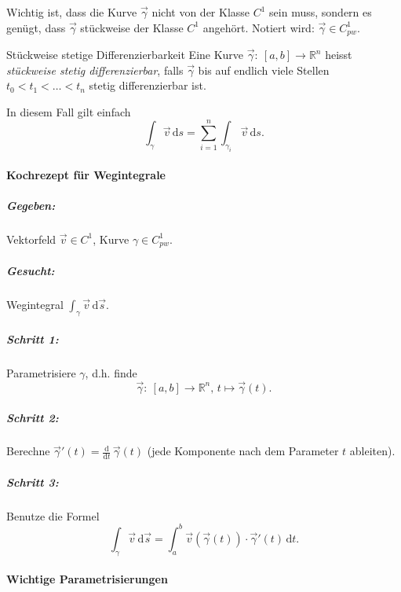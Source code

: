 \documentclass[a4paper,10pt]{article}
\def\R{\mathbb{R}}
\begin{document}
Wichtig ist, dass die Kurve \( \vec{\gamma} \) nicht von der Klasse \( C^1 \) sein muss, sondern es genügt, dass \( \vec{\gamma} \) stückweise der Klasse \( C^1 \) angehört. Notiert wird: \( \vec{\gamma} \in C^1_{pw} \).
\begin{subbox}{Stückweise stetige Differenzierbarkeit}
    Eine Kurve \( \vec{\gamma}: \: [a, b] \to \R^n \) heisst \emph{stückweise stetig differenzierbar}, falls \( \vec{\gamma} \) bis auf endlich viele Stellen \( t_0 < t_1 < \dots < t_n \) stetig differenzierbar ist.
\end{subbox}
In diesem Fall gilt einfach \[
    \int_\gamma \vec{v} \, \mathrm{d}s = \sum_{i = 1}^n \int_{\gamma_i} \vec{v} \, \mathrm{d}s \text{.}
\]

\paragraph{Kochrezept für Wegintegrale}

\subparagraph{Gegeben:} Vektorfeld \( \vec{v} \in C^1 \), Kurve \( \gamma \in C^1_{pw} \).

\subparagraph{Gesucht:} Wegintegral \( \int_\gamma \vec{v} \, \mathrm{d}\vec{s} \).

\subparagraph{Schritt 1:} Parametrisiere \( \gamma \), d.h. finde \[
    \vec{\gamma}: \: [a, b] \to \R^n, \, t \mapsto \vec{\gamma}(t) \text{.}
\]

\subparagraph{Schritt 2:} Berechne \( \vec{\gamma}'(t) = \frac{\mathrm{d}}{\mathrm{d}t} \, \vec{\gamma}(t)\) (jede Komponente nach dem Parameter \( t \) ableiten).

\subparagraph{Schritt 3:} Benutze die Formel
\[
    \int_\gamma \vec{v} \, \mathrm{d}\vec{s} = \int_a^b \vec{v}(\vec{\gamma}(t)) \cdot \vec{\gamma}'(t) \, \mathrm{d}t \text{.}
\]

\paragraph{Wichtige Parametrisierungen}
\end{document}

